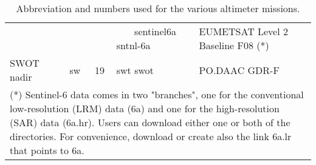 \begin{table}
\begin{tabular}{lccll}
            &    &    & ~~~ sentinel6a sntnl-6a & EUMETSAT Level 2 Baseline F08 (*) \\
SWOT nadir  & sw & 19 & swt swot                & PO.DAAC GDR-F \\
\hline
\multicolumn{5}{p{15cm}}{
(*) Sentinel-6 data comes in two "branches", one for the conventional low-resolution (LRM) data (6a) and one for the high-resolution (SAR) data (6a.hr). Users can download either one or both of the directories. For convenience, download or create also the link 6a.lr that points to 6a.} \\
\hline
\end{tabular}
\caption{Abbreviation and numbers used for the various altimeter missions.}
\label{tab:rads4_sats}
\end{table}
